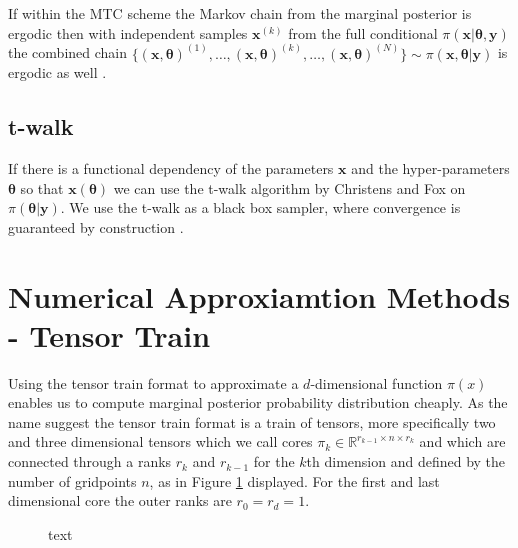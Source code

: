 If within the MTC scheme the Markov chain from the marginal posterior is ergodic then with independent samples $\bm{x}^{(k)}$ from the full conditional $\pi(\bm{x}|\bm{\theta}, \bm{y})$ the combined chain $\{  (\bm{x}, \bm{\theta} )^{(1)}, \dots, (\bm{x}, \bm{\theta} )^{(k)} , \dots,  (\bm{x}, \bm{\theta})^{(N)}  \} \sim \pi(\bm{x},\bm{\theta}| \bm{y})$ is ergodic as well \cite{acosta2014markov}.

\subsection{t-walk}
If there is a functional dependency of the parameters $\bm{x}$ and the hyper-parameters $\bm{\theta}$ so that $\bm{x}(\bm{\theta})$ we can use the t-walk algorithm by Christens and Fox on $\pi(\bm{\theta}|\bm{y} )$.
We use the t-walk as a black box sampler, where convergence is guaranteed by construction \cite{christen2010general}.



\section{Numerical Approxiamtion Methods - Tensor Train}
Using the tensor train format to approximate a $d$-dimensional function $\pi(x)$ enables us to compute marginal posterior probability distribution cheaply.
As the name suggest the tensor train format is a train of tensors, more specifically two and three dimensional tensors which we call cores $\pi_{k} \in \mathbb{R}^{r_{k-1} \times n \times r_{k}}$  and which are connected through a ranks $r_{k}$ and $r_{k-1}$ for the $k$th dimension and defined by the number of gridpoints $n$, as in Figure \ref{} displayed.
For the first and last dimensional core the outer ranks are $r_0  = r_d = 1$.




\begin{figure}[ht!]
	\centering
{} 
\caption{text}
\label{key}
	
\end{figure}


